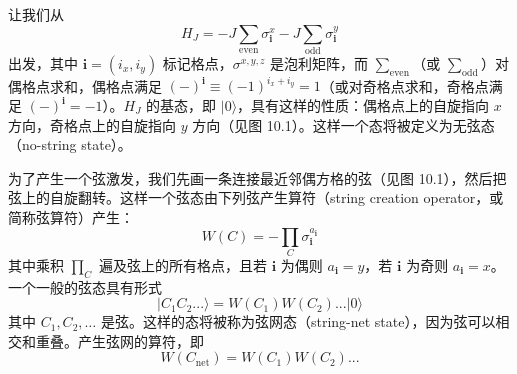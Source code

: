 
让我们从
\begin{equation*}
H_J=-J\sum_{\text{even}}\sigma_{\pmb{i}}^{x}-J\sum_{\text{odd}}\sigma_{\pmb{i}}^{y}
\end{equation*}
出发，其中 $\pmb{i}=(i_x,i_y)$ 标记格点，$\sigma^{x,y,z}$ 是泡利矩阵，而 $\sum_{\text{even}}$（或 $\sum_{\text{odd}}$）对偶格点求和，偶格点满足 $(-)^{\pmb{i}}\equiv(-1)^{i_x+i_y}=1$（或对奇格点求和，奇格点满足 $(-)^{\pmb{i}}=-1$）。$H_J$ 的基态，即 $|0\rangle$，具有这样的性质：偶格点上的自旋指向 $x$ 方向，奇格点上的自旋指向 $y$ 方向（见图 10.1）。这样一个态将被定义为无弦态（no-string state）。

为了产生一个弦激发，我们先画一条连接最近邻偶方格的弦（见图 10.1），然后把弦上的自旋翻转。这样一个弦态由下列弦产生算符（string creation operator，或简称弦算符）产生：
\begin{equation*}
W(C)=-\prod_{C}\sigma_{\pmb{i}}^{a_{\pmb{i}}}
\tag{10.3.1}
\end{equation*}
其中乘积 $\prod_{C}$ 遍及弦上的所有格点，且若 $\pmb{i}$ 为偶则 $a_{\pmb{i}}=y$，若 $\pmb{i}$ 为奇则 $a_{\pmb{i}}=x$。一个一般的弦态具有形式
\begin{equation*}
|C_1C_2...\rangle=W(C_1)W(C_2)...|0\rangle
\end{equation*}
其中 $C_1,C_2,\dots$ 是弦。这样的态将被称为弦网态（string-net state），因为弦可以相交和重叠。产生弦网的算符，即
\begin{equation*}
W(C_{\text{net}})=W(C_1)W(C_2)...
\end{equation*}
